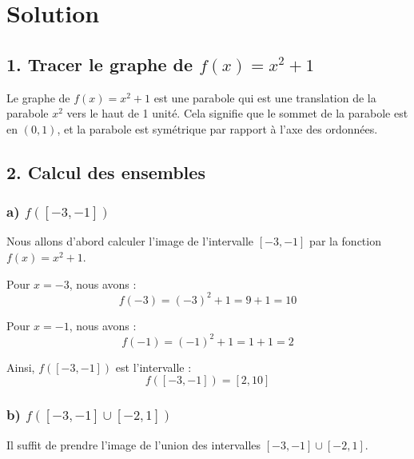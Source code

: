 \documentclass[a4paper,oneside,12pt]{amsbook}
\theoremstyle{definition}
\theoremstyle{remark}
\begin{document}
\section*{Solution}

\subsection*{1. Tracer le graphe de \( f(x) = x^2 + 1 \)}

Le graphe de \( f(x) = x^2 + 1 \) est une parabole qui est une translation de la parabole \( x^2 \) vers le haut de 1 unité. Cela signifie que le sommet de la parabole est en \( (0, 1) \), et la parabole est symétrique par rapport à l'axe des ordonnées.

\begin{center}
\end{center}

\subsection*{2. Calcul des ensembles}

\subsubsection*{a) \( f([-3, -1]) \)}

Nous allons d'abord calculer l'image de l'intervalle \( [-3, -1] \) par la fonction \( f(x) = x^2 + 1 \).

Pour \( x = -3 \), nous avons :
\[
f(-3) = (-3)^2 + 1 = 9 + 1 = 10
\]

Pour \( x = -1 \), nous avons :
\[
f(-1) = (-1)^2 + 1 = 1 + 1 = 2
\]

Ainsi, \( f([-3, -1]) \) est l'intervalle :
\[
f([-3, -1]) = [2, 10]
\]

\subsubsection*{b) \( f([-3, -1] \cup [-2, 1]) \)}

Il suffit de prendre l'image de l'union des intervalles \( [-3, -1] \cup [-2, 1] \).
\end{document}
